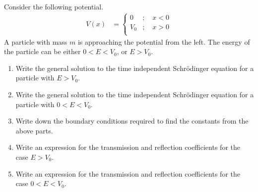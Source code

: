 \documentclass[fleqn, a4paper, 11pt, oneside]{amsart}
\theoremstyle{definition}
\theoremstyle{theorem}
\begin{document}
\begin{question}
	Consider the following potential.
	\begin{align*}
		V(x) &=
			\begin{cases}
				0   & ;\quad x < 0 \\
				V_0 & ;\quad x > 0 \\
			\end{cases}
	\end{align*}
	A particle with mass $m$ is approaching the potential from the left.
	The energy of the particle can be either $0 < E < V_0$, or $E > V_0$.
	\begin{enumerate}
		\item Write the general solution to the time independent Schrödinger equation for a particle with $E > V_0$.
		\item Write the general solution to the time independent Schrödinger equation for a particle with $ 0 < E < V_0$.
		\item Write down the boundary conditions required to find the constants from the above parts.
		\item Write an expression for the transmission and reflection coefficients for the case $E > V_0$.
		\item Write an expression for the transmission and reflection coefficients for the case $0 < E < V_0$.
	\end{enumerate}
\end{question}
\end{document}

